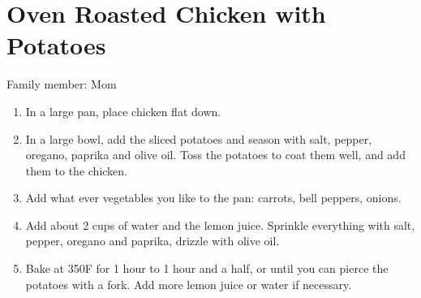 \chapter{Oven Roasted Chicken with Potatoes}
\label{ch:chickenandpotatoes}


Family member: Mom

\begin{enumerate}
    \item In a large pan, place chicken flat down.
    \item In a large bowl, add the sliced potatoes and season with salt, pepper, oregano, paprika and olive oil. Toss the potatoes to coat them well, and add them to the chicken.
    \item Add what ever vegetables you like to the pan: carrots, bell peppers, onions.
    \item Add about 2 cups of water and the lemon juice. Sprinkle everything with salt, pepper, oregano and paprika, drizzle with olive oil.
    \item Bake at 350\degree F for 1 hour to 1 hour and a half, or until you can pierce the potatoes with a fork. Add more lemon juice or water if necessary.
\end{enumerate}
